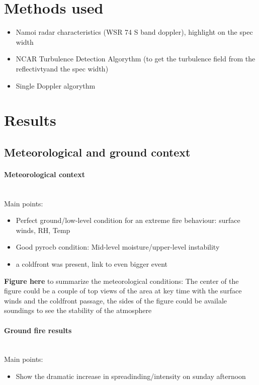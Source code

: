 \documentclass[12pt]{article}
\begin{document}
\section{Methods used}
\begin{itemize}
\item Namoi radar characteristics (WSR 74 S band doppler), highlight on the spec width
\item NCAR Turbulence Detection Algorythm (to get the turbulence field from the reflectivtyand the spec width)
\item Single Doppler algorythm
\end{itemize}

\section{Results}
\subsection{Meteorological and ground context}
\paragraph{Meteorological context}~\\

Main points:
\begin{itemize}
\item Perfect ground/low-level condition for an extreme fire behaviour: surface winds, RH, Temp 
\item Good pyrocb condition: Mid-level moisture/upper-level instability 
\item a coldfront was present, link to even bigger event
\end{itemize}

\textbf{Figure here} to summarize the meteorological conditions: The center of the figure could be a couple of top views of the area  at key time with the surface winds and the coldfront passage, the sides of the figure could be availale soundings to see the stability of the atmosphere

\paragraph{Ground fire results}~\\

Main points:
\begin{itemize}
\item Show the dramatic increase in spreadinding/intensity on sunday afternoon
\end{itemize}
\end{document}
